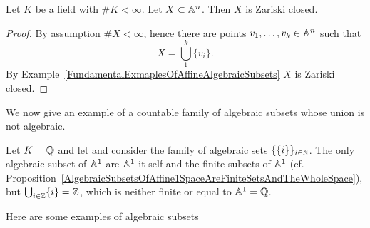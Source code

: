 \begin{proposition}\label{EverySubsetOfFiniteAffineSpaceIsAlgebraic}
    Let $K$ be a field with $\# K <\infty$. Let $X\subset \mathbb{A}^n$. Then $X$ is Zariski closed. 
\end{proposition}
\begin{proof}
    By assumption $\#X < \infty$, hence there are points $v_1,\dots,v_k\in \mathbb{A}^n$ such that 
    $$X = \bigcup_1^k \{v_i\}.$$
    By Example~\ref{FundamentalExmaplesOfAffineAlgebraicSubsets} $X$ is Zariski closed. 
\end{proof}
We now give an example of a countable family of algebraic subsets whose union is not algebraic. 
\begin{example}\label{ExampleOfCountableUnionOfAlgebraicSubsetsWhichIsNotAlgebraic}
    Let $K=\mathbb{Q}$ and let and consider the family of algebraic sets $\{ \{i\}\}_{i\in \mathbb{N}}$. The only algebraic subset of $\mathbb{A}^1$ are $\mathbb{A}^1$ it self and the finite subsets of $\mathbb{A}^1$ (cf. Proposition~\ref{AlgebraicSubsetsOfAffine1SpaceAreFiniteSetsAndTheWholeSpace}), but $\bigcup_{i\in \mathbb{Z}} \{i\} = \mathbb{Z}$, which is neither finite or equal to $\mathbb{A}^1=\mathbb{Q}$. 
\end{example}
Here are some examples of algebraic subsets

